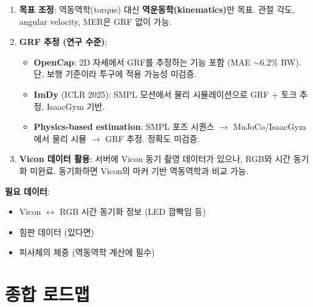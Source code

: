 \documentclass[11pt, a4paper]{report}
\begin{document}
\begin{enumerate}[leftmargin=*]
  \item \textbf{목표 조정}: 역동역학(torque) 대신 \textbf{역운동학(kinematics)}만 목표.
  관절 각도, angular velocity, MER은 GRF 없이 가능.

  \item \textbf{GRF 추정 (연구 수준)}:
  \begin{ossbox}
  \begin{itemize}[leftmargin=*]
    \item \textbf{OpenCap}: 2D 자세에서 GRF를 추정하는 기능 포함 (MAE $\sim$6.2\% BW). 단, 보행 기준이라 투구에 적용 가능성 미검증.
    \item \textbf{ImDy} (ICLR 2025): SMPL 모션에서 물리 시뮬레이션으로 GRF + 토크 추정. IsaacGym 기반.
    \item \textbf{Physics-based estimation}: SMPL 포즈 시퀀스 $\rightarrow$ MuJoCo/IsaacGym에서 물리 시뮬 $\rightarrow$ GRF 추정. 정확도 미검증.
  \end{itemize}
  \end{ossbox}

  \item \textbf{Vicon 데이터 활용}: 서버에 Vicon 동기 촬영 데이터가 있으나, RGB와 시간 동기화 미완료. 동기화하면 Vicon의 마커 기반 역동역학과 비교 가능.
\end{enumerate}

\begin{dataneedbox}
\textbf{필요 데이터}:
\begin{itemize}[leftmargin=*]
  \item Vicon $\leftrightarrow$ RGB 시간 동기화 정보 (LED 깜빡임 등)
  \item 힘판 데이터 (있다면)
  \item 피사체의 체중 (역동역학 계산에 필수)
\end{itemize}
\end{dataneedbox}


\chapter{종합 로드맵}
\end{document}
